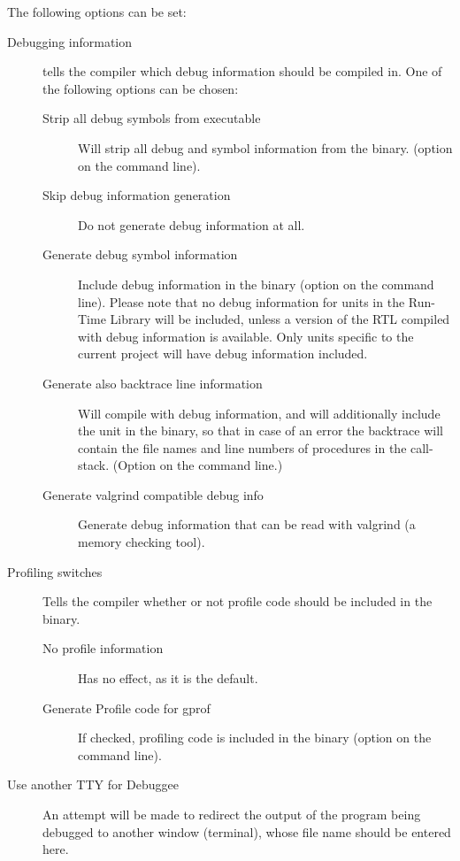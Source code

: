 The following options can be set:
\begin{description}
\item[Debugging information] tells the compiler which debug information
should be compiled in. One of the following options can be chosen:
\begin{description}
\item[Strip all debug symbols from executable] Will strip all debug and
symbol information from the binary. (option  on the command line).
\item[Skip debug information generation] Do not generate debug information
at all.
\item[Generate debug symbol information] Include debug information in the
binary (option  on the command line). Please note that no debug
information for units in the Run-Time Library will be included, unless a
version of the RTL compiled with debug information is available. Only units
specific to the current project will have debug information included.
\item[Generate also backtrace line information] Will compile with debug
information, and will additionally include the  unit in the
binary, so that in case of an error the backtrace will contain the file names and
line numbers of procedures in the call-stack. (Option  on the
command line.)
\item[Generate valgrind compatible debug info] Generate debug information
that can be read with valgrind (a memory checking tool).
\end{description}
\item[Profiling switches] Tells the compiler whether or not profile code
should be included in the binary.
\begin{description}
\item[No profile information] Has no effect, as it is the default.
\item[Generate Profile code for gprof] If checked, profiling code is
included in the binary (option  on the command line).
\end{description}
\item[Use another TTY for Debuggee]
An attempt will be made to redirect the output of the program
being debugged to another window (terminal), whose file name should
be entered here.
\end{description}

